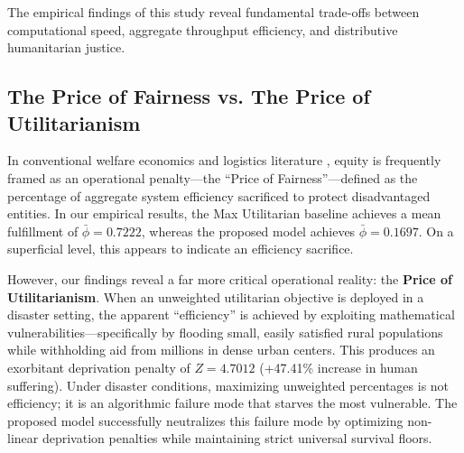 The empirical findings of this study reveal fundamental trade-offs between computational speed, aggregate throughput efficiency, and distributive humanitarian justice.

\subsection{The Price of Fairness vs. The Price of Utilitarianism}
In conventional welfare economics and logistics literature \citep{bertsimas2011price, vitoriano2011}, equity is frequently framed as an operational penalty---the ``Price of Fairness''---defined as the percentage of aggregate system efficiency sacrificed to protect disadvantaged entities. In our empirical results, the Max Utilitarian baseline achieves a mean fulfillment of $\bar{\phi} = 0.7222$, whereas the proposed model achieves $\bar{\phi} = 0.1697$. On a superficial level, this appears to indicate an efficiency sacrifice.

However, our findings reveal a far more critical operational reality: the \textbf{Price of Utilitarianism}. When an unweighted utilitarian objective is deployed in a disaster setting, the apparent ``efficiency'' is achieved by exploiting mathematical vulnerabilities—specifically by flooding small, easily satisfied rural populations while withholding aid from millions in dense urban centers. This produces an exorbitant deprivation penalty of $Z = 4.7012$ (+47.41\% increase in human suffering). Under disaster conditions, maximizing unweighted percentages is not efficiency; it is an algorithmic failure mode that starves the most vulnerable. The proposed model successfully neutralizes this failure mode by optimizing non-linear deprivation penalties while maintaining strict universal survival floors.

